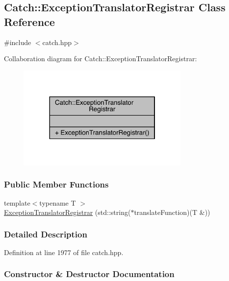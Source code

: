 \hypertarget{a00027}{}\subsection{Catch\+:\+:Exception\+Translator\+Registrar Class Reference}
\label{a00027}


{\ttfamily \#include $<$catch.\+hpp$>$}



Collaboration diagram for Catch\+:\+:Exception\+Translator\+Registrar\+:\nopagebreak
\begin{figure}[H]
\begin{center}
\leavevmode
\includegraphics[width=240pt]{a00187}
\end{center}
\end{figure}
\subsubsection*{Public Member Functions}
\begin{DoxyCompactItemize}
\item 
{\footnotesize template$<$typename T $>$ }\\\hyperlink{a00027_aa73229de911f26b1df6c6c87c4d9e04e}{Exception\+Translator\+Registrar} (std\+::string($\ast$translate\+Function)(T \&))
\end{DoxyCompactItemize}


\subsubsection{Detailed Description}


Definition at line 1977 of file catch.\+hpp.



\subsubsection{Constructor \& Destructor Documentation}
\hypertarget{a00027_aa73229de911f26b1df6c6c87c4d9e04e}{}

